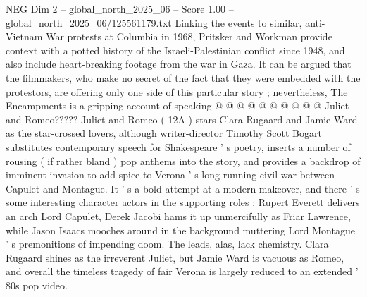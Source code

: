 \begin{textsample}{NEG Dim 2 – global\_north\_2025\_06 – Score 1.00 – global\_north\_2025\_06/125561179.txt}
Linking the events to similar, anti-Vietnam War protests at Columbia in 1968, Pritsker and Workman provide context with a potted history of the Israeli-Palestinian conflict since 1948, and also include heart-breaking footage from the war in Gaza.
It can be argued that the filmmakers, who make no secret of the fact that they were embedded with the protestors, are offering only one side of this particular story ; nevertheless, The Encampments is a gripping account of speaking @ @ @ @ @ @ @ @ @ @ Juliet and Romeo?????
Juliet and Romeo ( 12A ) stars Clara Rugaard and Jamie Ward as the star-crossed lovers, although writer-director Timothy Scott Bogart substitutes contemporary speech for Shakespeare ' s poetry, inserts a number of rousing ( if rather bland ) pop anthems into the story, and provides a backdrop of imminent invasion to add spice to Verona ' s long-running civil war between Capulet and Montague.
It ' s a bold attempt at a modern makeover, and there ' s some interesting character actors in the supporting roles : Rupert Everett delivers an arch Lord Capulet, Derek Jacobi hams it up unmercifully as Friar Lawrence, while Jason Isaacs mooches around in the background muttering Lord Montague ' s premonitions of impending doom.
The leads, alas, lack chemistry.
Clara Rugaard shines as the irreverent Juliet, but Jamie Ward is vacuous as Romeo, and overall the timeless tragedy of fair Verona is largely reduced to an extended ' 80s pop video.

\end{textsample}
